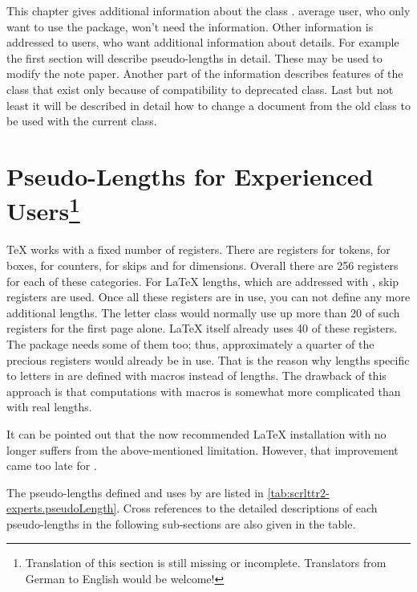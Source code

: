 This chapter gives additional information about the \KOMAScript{} class
.  average user, who only want to use the package, won't need
the information. Other information is addressed to users, who want additional
information about details. For example the first section will describe
pseudo-lengths in detail. These may be used to modify the note paper.  Another
part of the information describes features of the class that exist only
because of compatibility to deprecated  class. Last but not
least it will be described in detail how to change a document from the old
 class to be used with the current  class.


\section{Pseudo-Lengths for Experienced Users\protect\footnote{Translation of
    this section is still missing or incomplete. Translators from German to
    English would be welcome!}}
\label{sec:scrlttr2-experts.pseudoLengths}

{\TeX} works with a fixed number of registers. There are registers for tokens,
for boxes, for counters, for skips and for dimensions.  Overall there are 256
registers for each of these categories. For {\LaTeX} lengths, which are
addressed with , skip registers are used. Once all these
registers are in use, you can not define any more additional lengths.  The
letter class  would normally use up more than 20 of such
registers for the first page alone. {\LaTeX} itself already uses 40 of these
registers. The  package needs some of them too; thus,
approximately a quarter of the precious registers would already be in
use. That is the reason why lengths specific to letters in 
are defined with macros instead of lengths. The drawback of this approach is
that computations with macros is somewhat more complicated than with real
lengths.

It can be pointed out that the now recommended {\LaTeX} installation with
{\eTeX} no longer suffers from the above-mentioned limitation. However, that
improvement came too late for .

The pseudo-lengths defined and uses by  are listed in
\autoref{tab:scrlttr2-experts.pseudoLength}. Cross references to the detailed
descriptions of each pseudo-lengths in the following sub-sections are also
given in the table.

